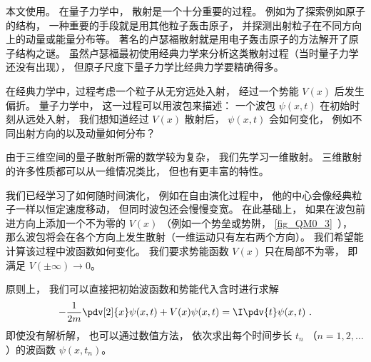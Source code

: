 
\begin{issues}
\issueTODO
\end{issues}


本文使用。 在量子力学中， 散射是一个十分重要的过程。 例如为了探索例如原子的结构， 一种重要的手段就是用其他粒子轰击原子， 并探测出射粒子在不同方向上的动量或能量分布等。 著名的卢瑟福散射就是用电子轰击原子的方法解开了原子结构之谜。 虽然卢瑟福最初使用经典力学来分析这类散射过程（当时量子力学还没有出现）， 但原子尺度下量子力学比经典力学要精确得多。

在经典力学中，过程考虑一个粒子从无穷远处入射， 经过一个势能 $V(x)$ 后发生偏折。 量子力学中， 这一过程可以用波包来描述： 一个波包 $\psi(x, t)$ 在初始时刻从远处入射， 我们想知道经过 $V(x)$ 散射后， $\psi(x, t)$ 会如何变化， 例如不同出射方向的以及动量如何分布？

由于三维空间的量子散射所需的数学较为复杂， 我们先学习一维散射。 三维散射的许多性质都可以从一维情况类比， 但也有更丰富的特性。

我们已经学习了如何随时间演化， 例如在自由演化过程中， 他的中心会像经典粒子一样以恒定速度移动， 但同时波包还会慢慢变宽。 在此基础上， 如果在波包前进方向上添加一个不为零的 $V(x)$ （例如一个势垒或势阱， \autoref{fig_QM0_3}~）， 那么波包将会在各个方向上发生散射（一维运动只有左右两个方向）。 我们希望能计算该过程中波函数如何变化。 我们要求势能函数 $V(x)$ 只在局部不为零， 即满足 $V(\pm\infty) \to 0$。 

原则上， 我们可以直接把初始波函数和势能代入含时进行求解
\begin{equation}\label{eq_Sca1D_1}
-\frac{1}{2m}\pdv[2]{x}\psi(x, t) + V(x) \psi(x, t) = \I \pdv{t} \psi(x, t)~.
\end{equation}
即使没有解析解， 也可以通过数值方法， 依次求出每个时间步长 $t_n$ （$n = 1, 2, \dots$）的波函数 $\psi(x, t_n)$。

